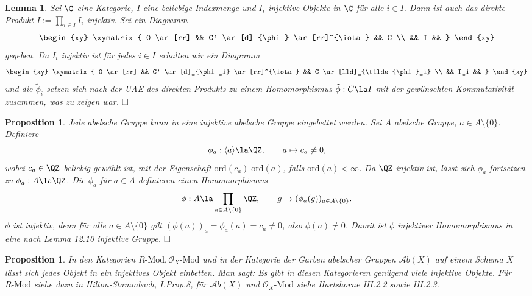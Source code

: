 \documentclass[11pt]{book}
\newtheorem{lemma}[theorem]{Lemma}
\newtheorem{proposition}[theorem]{Proposition}
\theoremstyle{nonumberbreak}
\newenvironment{pr}[1][]{\ifthenelse{\equal{#1}{}}{\proof}{\proof[#1]}\rm}{\endproof}
\newcommand{\Oxmod}{\underline{\mathcal{O}_X\textrm{-}\mathrm{Mod}}}
\newcommand{\Rmod}{\underline{R\textrm{-}\mathrm{Mod}}}
\newcommand{\AbX}{\underline{\mathcal{A}b}(X)}
\begin{document}
\begin{spacing}{1.4}
\begin{lemma}
Sei $\C$ eine Kategorie, $I$ eine beliebige Indexmenge und $I_i$ injektive Objekte in $\C$ für alle $i \in I$. Dann ist auch das direkte Produkt $I:= \prod_{i \in I} I_i$ injektiv.
\begin{pr}
Sei ein Diagramm 
$$
\begin{xy}
\xymatrix{
0 \ar[rr] && C' \ar[d]_{\phi} \ar[rr]^{\iota} && C \\ && I && 
}
\end{xy}
$$
gegeben. Da $I_i$ injektiv ist für jedes $i \in I$ erhalten wir ein Diagramm
$$
\begin{xy}
\xymatrix{
0 \ar[rr] && C' \ar[d]_{\phi_i} \ar[rr]^{\iota} && C \ar[lld]_{\tilde{\phi}_i} \\ && I_i && 
}
\end{xy}
$$
und die $\tilde{\phi}_i$ setzen sich nach der UAE des direkten Produkts zu einem Homomorphismus $\tilde{\phi}: C \la I$ mit der gewünschten Kommutativität zusammen, was zu zeigen war. $\hfill \Box$
\end{pr}
\end{lemma}


\begin{proposition}
Jede abelsche Gruppe kann in eine injektive abelsche Gruppe eingebettet werden.
\begin{pr}
Sei $A$ abelsche Gruppe, $a \in A \setminus \{0\}$. Definiere
$$\phi_a: \langle a \rangle \la \QZ, \qquad a \mapsto c_a \neq 0,$$
wobei $c_a \in \QZ$ beliebig gewählt ist, mit der Eigenschaft $\mathrm{ord}(c_a) \vert \mathrm{ord}(a)$, falls $\mathrm{ord}(a) < \infty$. Da $\QZ$ injektiv ist, lässt sich $\phi_a$ fortsetzen zu $\phi_a: A \la \QZ$. Die $\phi_a$ für $a \in A$ definieren einen Homomorphismus 
$$\phi: A\la \prod_{a \in A\setminus \{0\}} \QZ, \qquad g \mapsto (\phi_a(g))_{a \in A\setminus \{0\}}.$$
$\phi$ ist injektiv, denn für alle $a \in A\setminus \{0\}$ gilt $(\phi(a))_a = \phi_a(a) = c_a \neq 0$, also $\phi(a) \neq 0$. Damit ist $\phi$ injektiver Homomorphismus in eine nach Lemma 12.10 injektive Gruppe. $\hfill \Box$
\end{pr}

\end{proposition}


\begin{proposition}
In den Kategorien $\Rmod, \Oxmod$ und in der Kategorie der Garben abelscher Gruppen $\AbX$ auf einem Schema $X$ lässt sich jedes Objekt in ein injektives Objekt einbetten. Man sagt: Es gibt in diesen Kategorieren genügend viele injektive Objekte.
\begin{pr}
Für $\Rmod$ siehe dazu in Hilton-Stammbach, I.Prop.8, für $\AbX$ und $\Oxmod$ siehe Hartshorne III.2.2 sowie III.2.3.
\end{pr}


\end{proposition}
\end{spacing}
\end{document}
